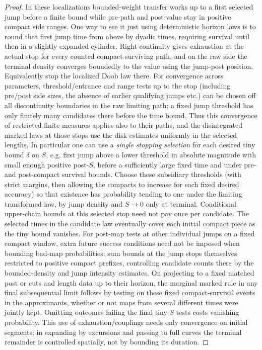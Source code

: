 \begin{proof}
In these localizations bounded-weight transfer works up to a first selected jump before a finite bound while pre-path and post-value stay in positive compact side ranges.
One way to see it just using deterministic horizon laws is to round that first jump time from above by dyadic times, requiring survival until then in a slightly expanded cylinder.
Right-continuity gives exhaustion at the actual stop for every counted compact-surviving path, and on the raw side the terminal density converges boundedly to the value using the jump-post position.
Equivalently stop the localized Doob law there.
For convergence across parameters, threshold/entrance and range tests up to the stop (including pre/post side sizes, the absence of earlier qualifying jumps etc.) can be chosen off all discontinuity boundaries in the raw limiting path; a fixed jump threshold has only finitely many candidates there before the time bound.
Thus this convergence of restricted finite measures applies also to their paths, and the disintegrated marked laws at those stops use the disk estimates uniformly in the selected lengths.
In particular one can use a \emph{single stopping selection} for each desired tiny bound \(\delta\) on \(S\), e.g. first jump above a lower threshold in absolute magnitude with small enough positive post-\(S\), before a sufficiently large fixed time and under pre- and post-compact survival bounds.
Choose these subsidiary thresholds (with strict margins, then allowing the compacts to increase for each fixed desired accuracy) so that existence has probability tending to one under the limiting transformed law, by jump density and \(S\to0\) only at terminal.
Conditional upper-chain bounds at this selected stop need not pay once per candidate.
The selected times in the candidate law eventually cover each initial compact piece as the tiny bound vanishes.
For post-map tests at other individual jumps on a fixed compact window, extra future success conditions need not be imposed when bounding bad-map probabilities: sum bounds at the jump stops themselves restricted to positive compact prefixes, controlling candidate counts there by the bounded-density and jump intensity estimates.
On projecting to a fixed matched post or cuts and length data up to their horizon, the marginal marked rule in any final subsequential limit follows by testing on these fixed compact-survival events in the approximants, whether or not maps from several different times were jointly kept.
Omitting outcomes failing the final tiny-\(S\) tests costs vanishing probability.
This use of exhaustion/couplings needs only convergence on initial segments; in expanding by excursions and passing to full curves the terminal remainder is controlled spatially, not by bounding its duration.


\end{proof}
